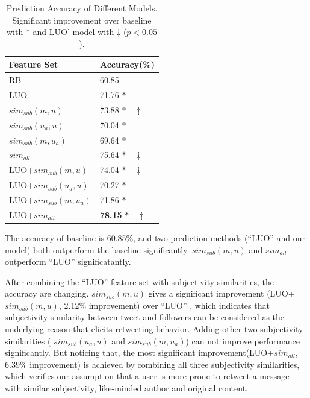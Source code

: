 \documentclass[letterpaper]{article}
\begin{document}
\begin{table}[h]
\centering
\caption{Prediction Accuracy of Different Models. Significant improvement over baseline with $ \ast $ and LUO' model with $ \ddagger $ ($p < 0.05$).}
\label{tab4}
\begin{tabular}{|l|l|}
\hline
Feature Set & Accuracy(\%) \\
\hline
RB & 60.85  \\
LUO & 71.76 $ \ast  $\\
$ sim_{sub} \left( m,u \right) $ & 73.88 $ \ast \quad \ddagger $\\
$ sim_{sub}\left( u_{a},u \right)  $ & 70.04 $ \ast  $\\
$ sim_{sub}\left( m,u_{a} \right)  $ &69.64 $ \ast  $\\
$ sim_{all}  $ & 75.64 $ \ast  \quad \ddagger $\\
LUO+$ sim_{sub} \left( m,u \right)$ & 74.04  $ \ast \quad \ddagger $ \\
LUO+$ sim_{sub}\left( u_{a},u \right)$ & 70.27  $ \ast $ \\
LUO+$ sim_{sub}\left( m,u_{a} \right)$ & 71.86  $ \ast $ \\
LUO+$ sim_{all}  $ & \textbf{78.15}  $ \ast \quad \ddagger $ \\
\hline
\end{tabular}
\end{table}

The accuracy of baseline is 60.85\%, and two prediction methods (``LUO'' and our model) both outperform the baseline significantly. 
$ sim_{sub} \left( m,u \right) $ and $ sim_{all}  $ outperform ``LUO'' significatantly.

After combining the ``LUO'' feature set with subjectivity similarities, the accuracy are changing. 
$ sim_{sub} \left( m,u \right) $ gives a significant improvement (LUO+$ sim_{sub} \left( m,u \right) $, 2.12\% improvement) over ``LUO'' , which indicates that subjectivity similarity between tweet and followers can be considered as the underlying reason that elicits retweeting behavior. 
Adding other two subjectivity similarities ( $ sim_{sub}\left( u_{a},u \right)$ and $ sim_{sub}\left( m,u_{a} \right)$) can not improve performance significantly. 
But noticing that, the most significant improvement(LUO+$ sim_{all}  $, 6.39\% improvement) is achieved by combining all three subjectivity similarities, which verifies our assumption that a user is more prone to retweet a message with similar subjectivity, like-minded author and original content. 
\end{document}
